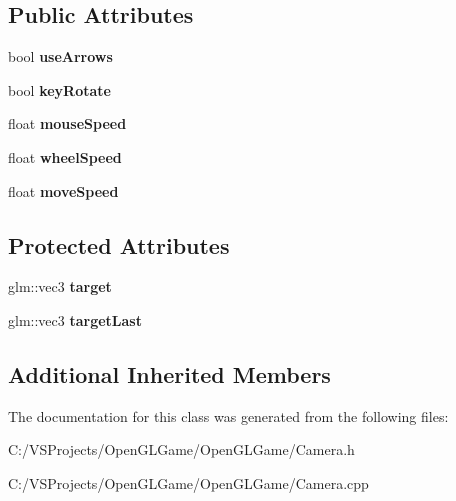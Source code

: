 \subsection*{Public Attributes}
\begin{DoxyCompactItemize}
\item 
\hypertarget{class_arc_ball_camera_a4bf5a5365d5cfb064bd34f83ff592fec}{bool {\bfseries use\-Arrows}}\label{class_arc_ball_camera_a4bf5a5365d5cfb064bd34f83ff592fec}

\item 
\hypertarget{class_arc_ball_camera_a2179e085cbc14e5d5717b78953d7c031}{bool {\bfseries key\-Rotate}}\label{class_arc_ball_camera_a2179e085cbc14e5d5717b78953d7c031}

\item 
\hypertarget{class_arc_ball_camera_a1ef4ff3470ed0d07c9ac8bfe5827ab93}{float {\bfseries mouse\-Speed}}\label{class_arc_ball_camera_a1ef4ff3470ed0d07c9ac8bfe5827ab93}

\item 
\hypertarget{class_arc_ball_camera_a24d6d740f7d247b7a0f0f179d69e0bc4}{float {\bfseries wheel\-Speed}}\label{class_arc_ball_camera_a24d6d740f7d247b7a0f0f179d69e0bc4}

\item 
\hypertarget{class_arc_ball_camera_a0f60255a83a364890d6a80c9bacea7e4}{float {\bfseries move\-Speed}}\label{class_arc_ball_camera_a0f60255a83a364890d6a80c9bacea7e4}

\end{DoxyCompactItemize}
\subsection*{Protected Attributes}
\begin{DoxyCompactItemize}
\item 
\hypertarget{class_arc_ball_camera_aeb1ff2a20b574cd7dfbe95c9af5c6722}{glm\-::vec3 {\bfseries target}}\label{class_arc_ball_camera_aeb1ff2a20b574cd7dfbe95c9af5c6722}

\item 
\hypertarget{class_arc_ball_camera_a5ecc997560f1afea39bf21d259a31774}{glm\-::vec3 {\bfseries target\-Last}}\label{class_arc_ball_camera_a5ecc997560f1afea39bf21d259a31774}

\end{DoxyCompactItemize}
\subsection*{Additional Inherited Members}


The documentation for this class was generated from the following files\-:\begin{DoxyCompactItemize}
\item 
C\-:/\-V\-S\-Projects/\-Open\-G\-L\-Game/\-Open\-G\-L\-Game/Camera.\-h\item 
C\-:/\-V\-S\-Projects/\-Open\-G\-L\-Game/\-Open\-G\-L\-Game/Camera.\-cpp\end{DoxyCompactItemize}
